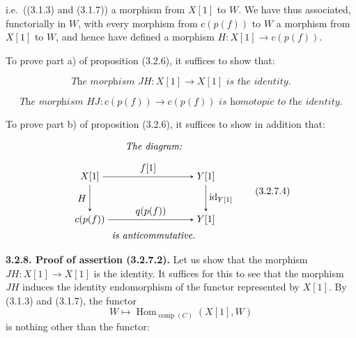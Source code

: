 \clearpage
{}%
i.e.\ ((3.1.3) and (3.1.7)) a morphism from $X[1]$ to $W$. We have thus
associated, functorially in $W$, with every morphism from $c(p(f))$ to $W$ a
morphism from $X[1]$ to $W$, and hence have defined a morphism
$H\colon X[1]\longrightarrow c(p(f))$.

To prove part a) of proposition (3.2.6), it suffices to show that:

\begin{equation}
  \textit{The morphism }JH\colon X[1]\longrightarrow X[1]
  \textit{ is the identity.}
  \tag{3.2.7.2}
\end{equation}

\begin{equation}
  \textit{The morphism }HJ\colon c(p(f))\longrightarrow c(p(f))
  \textit{ is homotopic to the identity.}
  \tag{3.2.7.3}
\end{equation}

To prove part b) of proposition (3.2.6), it suffices to show in addition
that:

\begin{equation}
  \begin{gathered}
    \textit{The diagram:}\\[0.35em]
    \begin{tikzpicture}[>=stealth,baseline=(current bounding box.center)]
      \node (Xs)  at (0,1.55) {$X[1]$};
      \node (Ys1) at (4.2,1.55) {$Y[1]$};
      \node (Cpf) at (0,0) {$c(p(f))$};
      \node (Ys2) at (4.2,0) {$Y[1]$};
      \draw[->] (Xs) -- node[above] {$f[1]$} (Ys1);
      \draw[->] (Xs) -- node[left] {$H$} (Cpf);
      \draw[->] (Ys1) -- node[right] {$\operatorname{id}_{Y[1]}$} (Ys2);
      \draw[->] (Cpf) -- node[above] {$q(p(f))$} (Ys2);
    \end{tikzpicture}\\[-0.15em]
    \textit{is anticommutative.}
  \end{gathered}
  \tag{3.2.7.4}
\end{equation}

\noindent\textbf{3.2.8. Proof of assertion (3.2.7.2).}\quad
{}
Let us show that the morphism $JH\colon X[1]\longrightarrow X[1]$ is the
identity. It suffices for this to see that the morphism $JH$ induces the
identity endomorphism of the functor represented by $X[1]$.
By (3.1.3) and (3.1.7), the functor
\begin{equation*}
  W\longmapsto
  \operatorname{Hom}_{\operatorname{comp}(C)}(X[1],W)
\end{equation*}
is nothing other than the functor:

